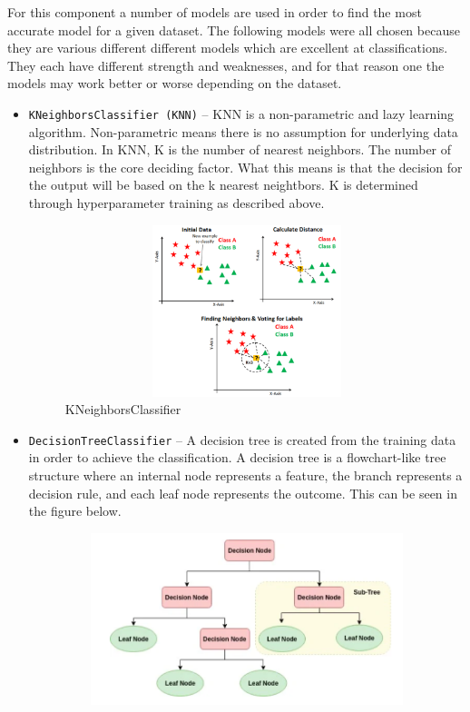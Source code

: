 For this component a number of models are used in order to find the most accurate model for a given dataset. The following models were all chosen because they are various different different models which are excellent at classifications. They each have different strength and weaknesses, and for that reason one the models may work better or worse depending on the dataset.
\begin{itemize}
    \item \texttt{KNeighborsClassifier (KNN)} -- KNN is a non-parametric and lazy learning algorithm. Non-parametric means there is no assumption for underlying data distribution. In KNN, K is the number of nearest neighbors. The number of neighbors is the core deciding factor. What this means is that the decision for the output will be based on the k nearest neightbors. K is determined through hyperparameter training as described above.
    \begin{figure}[h!]
        \centering
        \includegraphics[width=15cm,height=5cm,keepaspectratio]{implementation/kNN.png}
        \caption{KNeighborsClassifier}
        \label{fig:kNN}
    \end{figure}
    \item \texttt{DecisionTreeClassifier} -- A decision tree is created from the training data in order to achieve the classification. A decision tree is a flowchart-like tree structure where an internal node represents a feature, the branch represents a decision rule, and each leaf node represents the outcome. This can be seen in the figure below.
    \begin{figure}[h!]
        \centering
        \includegraphics[width=15cm,height=5cm,keepaspectratio]{implementation/decisionTree.png}

\end{figure}
\end{itemize}

